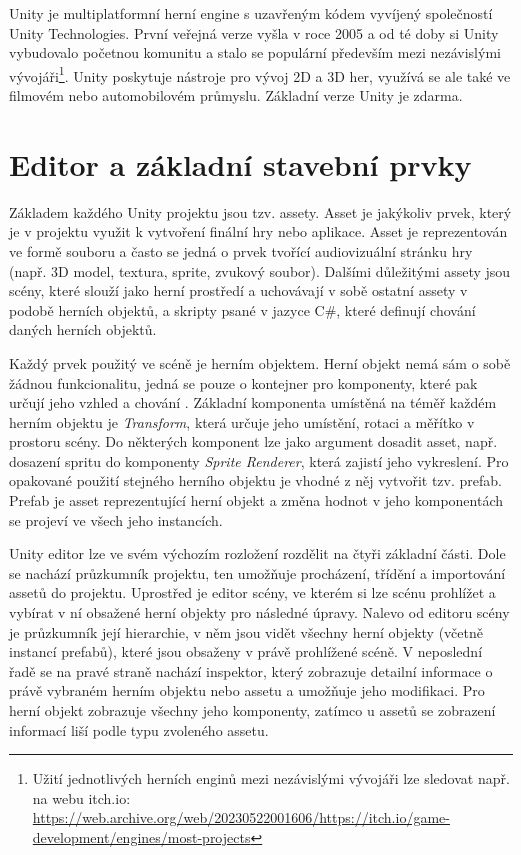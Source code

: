 \documentclass[FM,Proj]{tulthesis}
\begin{document}
	
	Unity je multiplatformní herní engine s uzavřeným kódem vyvíjený společností Unity Technologies. První veřejná verze vyšla v roce 2005 a od té doby si Unity vybudovalo početnou komunitu a stalo se populární především mezi nezávislými vývojáři\footnote{Užití jednotlivých herních enginů mezi nezávislými vývojáři lze sledovat např. na webu itch.io: \url{https://web.archive.org/web/20230522001606/https://itch.io/game-development/engines/most-projects}}. Unity poskytuje nástroje pro vývoj 2D a 3D her, využívá se ale také ve filmovém nebo automobilovém průmyslu. Základní verze Unity je zdarma.
	
	\section{Editor a základní stavební prvky}
	
	Základem každého Unity projektu jsou tzv. assety. Asset je jakýkoliv prvek, který je v projektu využit k vytvoření finální hry nebo aplikace. Asset je reprezentován ve formě souboru a často se jedná o prvek tvořící audiovizuální stránku hry (např. 3D model, textura, sprite, zvukový soubor). Dalšími důležitými assety jsou scény, které slouží jako herní prostředí a uchovávají v sobě ostatní assety v podobě herních objektů, a skripty psané v jazyce C\#, které definují chování daných herních objektů.  \cite{UnityDocsAssetWorkflow}
	
	Každý prvek použitý ve scéně je herním objektem. Herní objekt nemá sám o sobě žádnou funkcionalitu, jedná se pouze o kontejner pro komponenty, které pak určují jeho vzhled a chování \cite{UnityDocsGameObject}. Základní komponenta umístěná na téměř každém herním objektu je \textit{Transform}, která určuje jeho umístění, rotaci a měřítko v prostoru scény. Do některých komponent lze jako argument dosadit asset, např. dosazení spritu do komponenty \textit{Sprite Renderer}, která zajistí jeho vykreslení. Pro opakované použití stejného herního objektu je vhodné z něj vytvořit tzv. prefab. Prefab je asset reprezentující herní objekt a změna hodnot v jeho komponentách se projeví ve všech jeho instancích.
	
	Unity editor lze ve svém výchozím rozložení rozdělit na čtyři základní části. Dole se nachází průzkumník projektu, ten umožňuje procházení, třídění a importování assetů do projektu. Uprostřed je editor scény, ve kterém si lze scénu prohlížet a vybírat v ní obsažené herní objekty pro následné úpravy. Nalevo od editoru scény je průzkumník její hierarchie, v něm jsou vidět všechny herní objekty (včetně instancí prefabů), které jsou obsaženy v právě prohlížené scéně. V neposlední řadě se na pravé straně nachází inspektor, který zobrazuje detailní informace o právě vybraném herním objektu nebo assetu a umožňuje jeho modifikaci. Pro herní objekt zobrazuje všechny jeho komponenty, zatímco u assetů se zobrazení informací liší podle typu zvoleného assetu.
	
\end{document}
